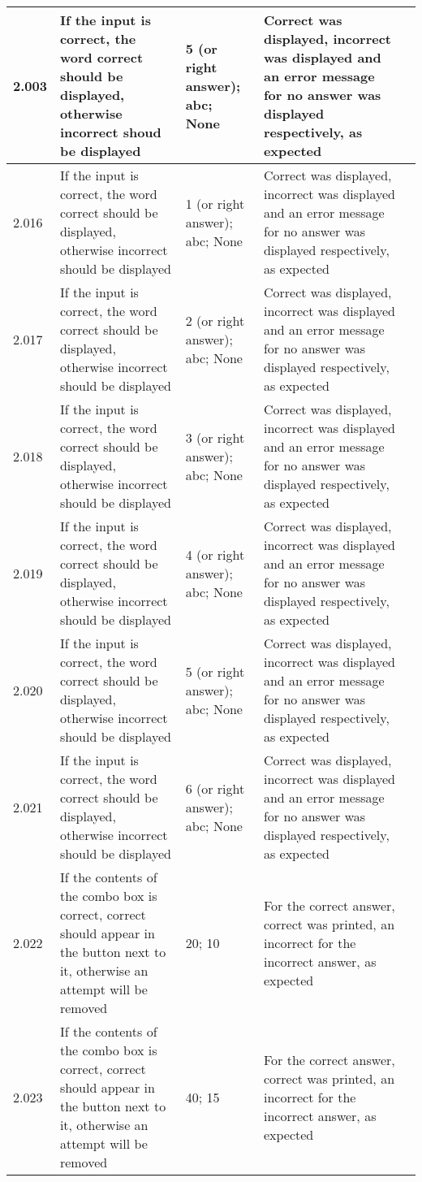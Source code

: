 \begin{landscape}
\begin{center}
\begin{longtable}{|p{2.5cm}|p{4cm}|p{4cm}|p{4.5cm}|p{3cm}|}
2.003 & If the input is correct, the word correct should be displayed, otherwise incorrect shoud be displayed & 5 (or right answer); abc; None & Correct was displayed, incorrect was displayed and an error message for no answer was displayed respectively, as expected & \\ \hline
2.016 & If the input is correct, the word correct should be displayed, otherwise incorrect should be displayed & 1 (or right answer); abc; None & Correct was displayed, incorrect was displayed and an error message for no answer was displayed respectively, as expected & \\ \hline
2.017 & If the input is correct, the word correct should be displayed, otherwise incorrect should be displayed & 2 (or right answer); abc; None & Correct was displayed, incorrect was displayed and an error message for no answer was displayed respectively, as expected & \\ \hline
2.018 & If the input is correct, the word correct should be displayed, otherwise incorrect should be displayed & 3 (or right answer); abc; None & Correct was displayed, incorrect was displayed and an error message for no answer was displayed respectively, as expected & \\ \hline
2.019 & If the input is correct, the word correct should be displayed, otherwise incorrect should be displayed & 4 (or right answer); abc; None & Correct was displayed, incorrect was displayed and an error message for no answer was displayed respectively, as expected & \\ \hline
2.020 & If the input is correct, the word correct should be displayed, otherwise incorrect should be displayed & 5 (or right answer); abc; None & Correct was displayed, incorrect was displayed and an error message for no answer was displayed respectively, as expected & \\ \hline
2.021 & If the input is correct, the word correct should be displayed, otherwise incorrect should be displayed & 6 (or right answer); abc; None & Correct was displayed, incorrect was displayed and an error message for no answer was displayed respectively, as expected & \\ \hline
2.022 & If the contents of the combo box is correct, correct should appear in the button next to it, otherwise an attempt will be removed & 20; 10 & For the correct answer, correct was printed, an incorrect for the incorrect answer, as expected & \\ \hline
2.023 & If the contents of the combo box is correct, correct should appear in the button next to it, otherwise an attempt will be removed & 40; 15 & For the correct answer, correct was printed, an incorrect for the incorrect answer, as expected & \\ \hline

\end{longtable}
\end{center}
\end{landscape}

